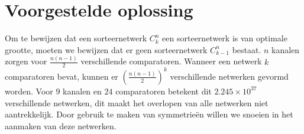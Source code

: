 \documentclass{article}
\begin{document}
\section{Voorgestelde oplossing}
Om te bewijzen dat een sorteernetwerk $C^n_k$ een sorteernetwerk is van optimale grootte, moeten we bewijzen dat er geen sorteernetwerk $C^n_{k-1}$ bestaat.
$n$ kanalen zorgen voor $\frac{n \left(n-1\right)}{2}$ verschillende comparatoren.
Wanneer een netwerk $k$ comparatoren bevat, kunnen er $\left(\frac{n \left(n-1\right)}{2}\right) ^k$ verschillende netwerken gevormd worden.
Voor $9$ kanalen en $24$ comparatoren betekent dit $2.245 \times 10^{37}$ verschillende netwerken, dit maakt het overlopen van alle netwerken niet aantrekkelijk.
Door gebruik te maken van symmetrie\"en willen we snoeien in het aanmaken van deze netwerken.
\end{document}
